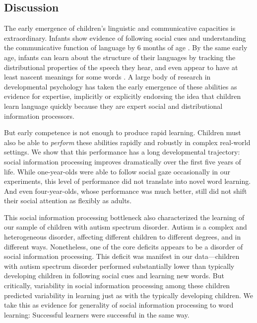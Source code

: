 \documentclass{pnastwo}
\begin{document}
\begin{article}
\section{Discussion}

The early emergence of children's linguistic and communicative capacities is extraordinary. Infants show evidence of following social cues and understanding the communicative function of language by 6 months of age \citep{senju2008, vouloumanos2014}. By the same early age, infants can learn about the structure of their languages by tracking the distributional properties of the speech they hear, and even appear to have at least nascent meanings for some words \citep{thiessen2003, bergelson2012}. A large body of research in developmental psychology has taken the early emergence of these abilities as evidence for expertise, implicitly or explicitly endorsing the idea that children learn language quickly because they are expert social and distributional information processors.

But early competence is not enough to produce rapid learning. Children must also be able to \emph{perform} these abilities rapidly and robustly in complex real-world settings. We show that this performance has a long developmental trajectory: social information processing improves dramatically over the first five years of life. While one-year-olds were able to follow social gaze occasionally in our experiments, this level of performance did not translate into novel word learning. And even four-year-olds, whose performance was much better, still did not shift their social attention as flexibly as adults.

This social information processing bottleneck also characterized the learning of our sample of children with autism spectrum disorder. Autism is a complex and heterogeneous disorder, affecting different children to different degrees, and in different ways. Nonetheless, one of the core deficits appears to be a disorder of social information processing. This deficit was manifest in our data---children with autism spectrum disorder performed substantially lower than typically developing children in following social cues and learning new words. But critically, variability in social information processing among these children predicted variability in learning just as with the typically developing children.  We take this as evidence for generality of social information processing to word learning: Successful learners were successful in the same way.


\end{article}
\end{document}

